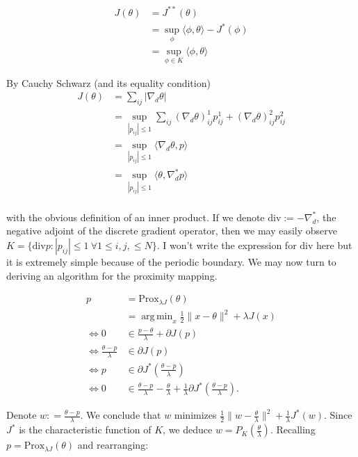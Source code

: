 \documentclass[paper=a4, fontsize=11pt]{scrartcl} %
\DeclareMathOperator*{\argmin}{arg\,min}
\numberwithin{equation}{section} %
\numberwithin{figure}{section} %
\numberwithin{table}{section} %
\newcommand{\prox}{\text{Prox}}
\newcommand{\grad}{\nabla_{d} }
\newcommand{\divg}{\text{div}}
\begin{document}
\begin{align*}
  J(\theta) &= J^{**}(\theta) \\ 
  &= \sup_{\phi} \langle \phi, \theta \rangle - J^{*}(\phi) \\
  &= \sup_{\phi\in K} \langle \phi, \theta \rangle
\end{align*}

By Cauchy Schwarz (and its equality condition)   
\begin{align*}
  J(\theta) &= \sum_{ij} | \grad \theta | \\ 
  &= \sup_{|p_{ij}| \leq 1} \sum_{ij} (\grad\theta)^1_{ij} p^{1}_{ij} + (\grad\theta)^2_{ij} p^{2}_{ij} \\
  &= \sup_{|p_{ij}| \leq 1} \langle \grad\theta, p  \rangle \\
  &= \sup_{|p_{ij}| \leq 1} \langle \theta, \grad^{*} p  \rangle \\
\end{align*}

with the obvious definition of an inner product. If we denote $ \divg
:= -\grad^{*}$, the negative adjoint of the discrete gradient
operator, then we may easily observe $K = \{ \divg p: |p_{ij}| \leq 1
\ \forall 1 \leq i,j, \leq N \}$. I won't write the expression for
$\divg$ here but it is extremely simple because of the periodic
boundary. We may now turn to deriving an algorithm for the proximity
mapping.

\begin{align*}
  p &= \prox_{\lambda J}(\theta) \\ 
  &= \argmin_{x} \frac{1}{2}\| x- \theta \|^2 + \lambda J(x) \\
  \Leftrightarrow 0 &\in \frac{p - \theta}{\lambda} + \partial J(p) \\
  \Leftrightarrow \frac{\theta - p}{\lambda} &\in \partial J(p) \\
  \Leftrightarrow p &\in \partial J^{*}( \frac{\theta - p}{\lambda}) \\
  \Leftrightarrow 0
  &\in \frac{\theta - p}{\lambda} - \frac{\theta}{\lambda} + \frac{1}{\lambda} \partial J^{*}( \frac{\theta - p}{\lambda}).
\end{align*}

Denote $w: = \frac{\theta - p }{\lambda}$. We conclude that $w$
minimizes $\frac{1}{2}\| w - \frac{\theta}{\lambda}\|^2 +
\frac{1}{\lambda}J^{*}(w)$.  Since $J^{*}$ is the characteristic
function of $K$, we deduce $w = P_{K}( \frac{\theta}{\lambda} )$.
Recalling $p = \prox_{\lambda J}(\theta)$ and rearranging:
\end{document}
